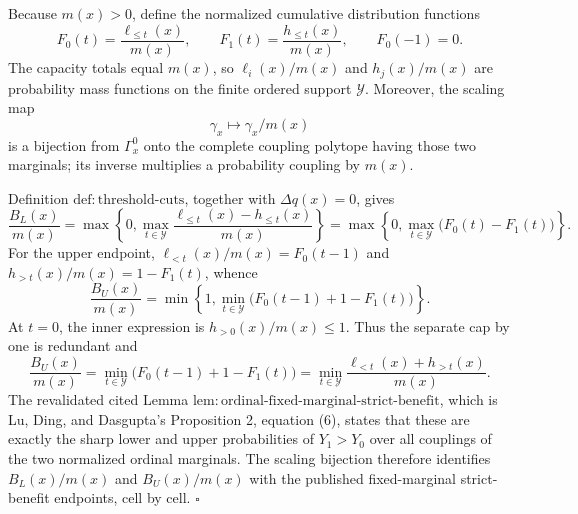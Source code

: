 Because \(m(x)>0\), define the normalized cumulative distribution functions
\[
F_0(t)=\frac{\ell_{\le t}(x)}{m(x)},
\qquad
F_1(t)=\frac{h_{\le t}(x)}{m(x)},
\qquad
F_0(-1)=0.
\]
The capacity totals equal \(m(x)\), so \(\ell_i(x)/m(x)\) and \(h_j(x)/m(x)\) are probability mass functions on the finite ordered support \(\mathcal Y\).  Moreover, the scaling map
\[
\gamma_x\longmapsto \gamma_x/m(x)
\]
is a bijection from \(\Gamma_x^{0}\) onto the complete coupling polytope having those two marginals; its inverse multiplies a probability coupling by \(m(x)\).

Definition \(\mathrm{def{:}threshold\text{-}cuts}\), together with \(\Delta q(x)=0\), gives
\[
\frac{B_L(x)}{m(x)}
=\max\left\{0,\max_{t\in\mathcal Y}
\frac{\ell_{\le t}(x)-h_{\le t}(x)}{m(x)}\right\}
=\max\left\{0,\max_{t\in\mathcal Y}\bigl(F_0(t)-F_1(t)\bigr)\right\}.
\]
For the upper endpoint, \(\ell_{<t}(x)/m(x)=F_0(t-1)\) and \(h_{>t}(x)/m(x)=1-F_1(t)\), whence
\[
\frac{B_U(x)}{m(x)}
=\min\left\{1,\min_{t\in\mathcal Y}
\bigl(F_0(t-1)+1-F_1(t)\bigr)\right\}.
\]
At \(t=0\), the inner expression is \(h_{>0}(x)/m(x)\le1\).  Thus the separate cap by one is redundant and
\[
\frac{B_U(x)}{m(x)}
=\min_{t\in\mathcal Y}\bigl(F_0(t-1)+1-F_1(t)\bigr)
=\min_{t\in\mathcal Y}
\frac{\ell_{<t}(x)+h_{>t}(x)}{m(x)}.
\]
The revalidated cited Lemma \(\mathrm{lem{:}ordinal\text{-}fixed\text{-}marginal\text{-}strict\text{-}benefit}\), which is Lu, Ding, and Dasgupta's Proposition 2, equation (6), states that these are exactly the sharp lower and upper probabilities of \(Y_1>Y_0\) over all couplings of the two normalized ordinal marginals.  The scaling bijection therefore identifies \(B_L(x)/m(x)\) and \(B_U(x)/m(x)\) with the published fixed-marginal strict-benefit endpoints, cell by cell. \(\square\)